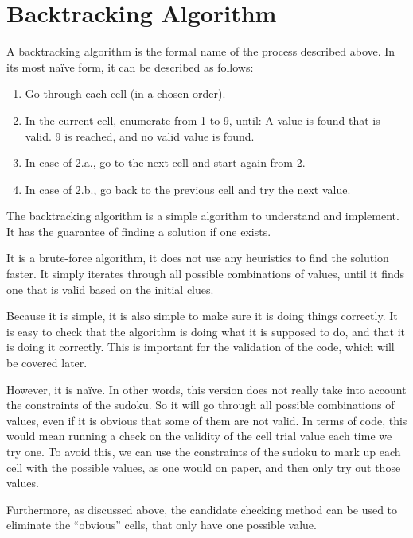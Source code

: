 \documentclass[12pt]{report} %
\begin{document}
\section{Backtracking Algorithm}

A backtracking algorithm is the formal name of the process described above\cite{cornell_sudoku}.
In its most naïve form, it can be described as follows:

\begin{enumerate}
  \item Go through each cell (in a chosen order).
  \item In the current cell, enumerate from 1 to 9, until:
   A value is found that is valid.
   9 is reached, and no valid value is found.
  \item In case of 2.a., go to the next cell and start again from 2.
  \item In case of 2.b., go back to the previous cell and try the next value.

\end{enumerate}

The backtracking algorithm is a simple algorithm to understand and implement. It has the guarantee of finding a solution if one exists.

It is a brute-force algorithm, it does not use any heuristics to find the solution faster. It simply iterates through all possible combinations of values, until it finds one that is valid based on the initial clues.

Because it is simple, it is also simple to make sure it is doing things correctly. It is easy to check that the algorithm is doing what it is supposed to do, and that it is doing it correctly. This is important for the validation of the code, which will be covered later.

However, it is naïve. In other words, this version does not really take into account the constraints of the sudoku. So it will go through all possible combinations of values, even if it is obvious that some of them are not valid. In terms of code, this would mean running a check on the validity of the cell trial value each time we try one. To avoid this, we can use the constraints of the sudoku to mark up each cell with the possible values, as one would on paper, and then only try out those values.

Furthermore, as discussed above, the candidate checking method can be used to eliminate the ``obvious'' cells, that only have one possible value.
\end{document}
